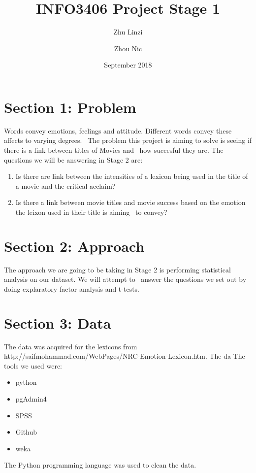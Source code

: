 \documentclass[12pt,a4paper]{article}
\begin{document}
\begin{titlepage}
    \title{INFO3406 Project Stage 1}
    \author{Zhu Linzi\\
            \and
            Zhou Nic
    }
    \date{September 2018}
    \maketitle
\end{titlepage}

    \pagebreak
    \tableofcontents
    \pagebreak

    \section{Section 1: Problem}
    Words convey emotions, feelings and attitude. Different words convey these affects to varying degrees. \
    The problem this project is aiming to solve is seeing if there is a link between titles of Movies and \
    how succesful they are.
    \newline \newline
    The questions we will be answering in Stage 2 are:

    \begin{enumerate}
        \item Is there are link between the intensities of a lexicon being used in the title of a movie and the critical acclaim?
        \item Is there a link between movie titles and movie success based on the emotion the leixon used in their title is aiming \
        to convey?

    \end{enumerate}

    \section{Section 2: Approach}
    The approach we are going to be taking in Stage 2 is performing statistical analysis on our dataset. We will attempt to \
    answer the questions we set out by doing explaratory factor analysis and t-tests.

    \section{Section 3: Data}

    The data was acquired for the lexicons from http://saifmohammad.com/WebPages/NRC-Emotion-Lexicon.htm. The da
    \newline \newline
    The tools we used were:

    \begin{itemize}
        \item python
        \item pgAdmin4
        \item SPSS
        \item Github
        \item weka
    \end{itemize}
    The Python programming language was used to clean the data.
    \appendix
\end{document}
